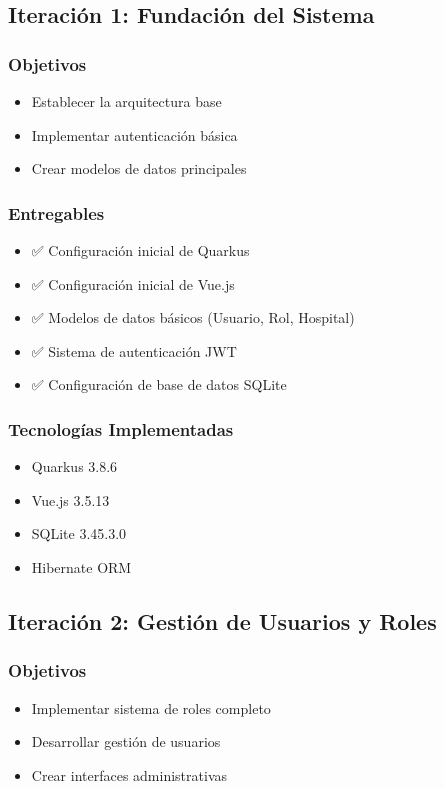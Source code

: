 \documentclass[12pt,a4paper]{article}
\begin{document}
\subsection{Iteración 1: Fundación del Sistema}

\subsubsection{Objetivos}
\begin{itemize}
    \item Establecer la arquitectura base
    \item Implementar autenticación básica
    \item Crear modelos de datos principales
\end{itemize}

\subsubsection{Entregables}
\begin{itemize}
    \item ✅ Configuración inicial de Quarkus
    \item ✅ Configuración inicial de Vue.js
    \item ✅ Modelos de datos básicos (Usuario, Rol, Hospital)
    \item ✅ Sistema de autenticación JWT
    \item ✅ Configuración de base de datos SQLite
\end{itemize}

\subsubsection{Tecnologías Implementadas}
\begin{itemize}
    \item Quarkus 3.8.6
    \item Vue.js 3.5.13
    \item SQLite 3.45.3.0
    \item Hibernate ORM
\end{itemize}

\subsection{Iteración 2: Gestión de Usuarios y Roles}

\subsubsection{Objetivos}
\begin{itemize}
    \item Implementar sistema de roles completo
    \item Desarrollar gestión de usuarios
    \item Crear interfaces administrativas
\end{itemize}
\end{document}
